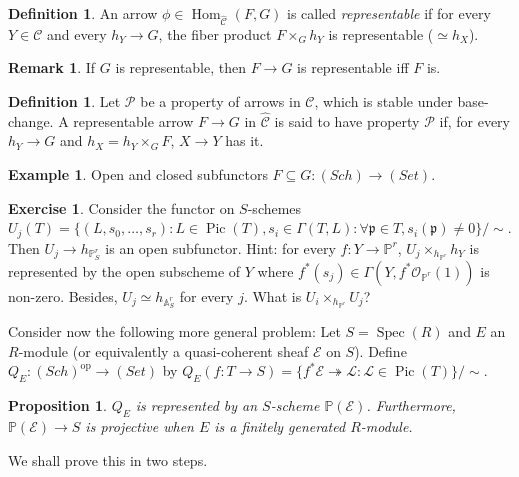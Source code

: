 \documentclass[11pt,twoside]{report}
\newcommand{\PP}{\mathbb P}
\newcommand{\OO}{\mathcal O}
\renewcommand{\to}{\rightarrow}
\newcommand{\Aaff}{\mathbb A}
\newcommand{\Spec}{\operatorname{Spec}}
\newcommand{\Pic}{\operatorname{Pic}}
\newcommand{\Hom}{\operatorname{Hom}}
\theoremstyle{plain}
\newtheorem{prop}[thm]{Proposition}
\theoremstyle{definition}
\newtheorem{exa}[thm]{Example}
\newtheorem{exe}[thm]{Exercise}
\newtheorem{dfn}[thm]{Definition}
\newtheorem{rem}[thm]{Remark}
\begin{document}
\begin{dfn}
 An arrow $\phi\in\Hom_{\widehat{\mathcal C}}(F,G)$ is called \emph{representable} if for every $Y\in\mathcal C$ and every $h_Y\to G$, the fiber product $F\times_G h_Y$ is representable ($\simeq h_X$).
\end{dfn}
\begin{rem}
 If $G$ is representable, then $F\to G$ is representable iff $F$ is.
\end{rem}
\begin{dfn}
 Let $\mathcal P$ be a property of arrows in $\mathcal C$, which is stable under base-change. A representable arrow $F\to G$ in $\widehat{\mathcal C}$ is said to have property $\mathcal P$ if, for every $h_Y\to G$ and $h_X=h_Y\times_G F$, $X\to Y$ has it.
\end{dfn}
\begin{exa}
 Open and closed subfunctors $F\subseteq G\colon(Sch)\to(Set)$.
\end{exa}
\begin{exe}
 Consider the functor on $S$-schemes $U_j(T)=\{(L,s_0,\ldots,s_r):L\in\Pic(T),s_i\in\Gamma(T,L):\forall \mathfrak p\in T,s_i(\mathfrak p)\neq 0\}/\sim$. Then $U_j\to h_{\PP^r_S}$ is an open subfunctor. Hint: for every $f\colon Y\to\PP^r$, $U_j\times_{h_{\PP^r}}h_Y$ is represented by the open subscheme of $Y$ where $f^*(s_j)\in\Gamma(Y,f^*\OO_{\PP^r}(1))$ is non-zero. Besides, $U_j\simeq h_{\Aaff^r_S}$ for every $j$. What is $U_i\times_{h_{\PP^r}}U_j$?
\end{exe}
Consider now the following more general problem: Let $S=\Spec(R)$ and $E$ an $R$-module (or equivalently a quasi-coherent sheaf $\mathcal E$ on $S$). Define $Q_E\colon(Sch)^\text{op}\to(Set)$ by $Q_E(f\colon T\to S)=\{f^*\mathcal E\twoheadrightarrow\mathcal L:\mathcal L\in\Pic(T)\}/\sim$.
\begin{prop}
 $Q_E$ is represented by an $S$-scheme $\PP(\mathcal E)$. Furthermore, $\PP(\mathcal E)\to S$ is projective when $E$ is a finitely generated $R$-module.
\end{prop}
We shall prove this in two steps.
\end{document}
